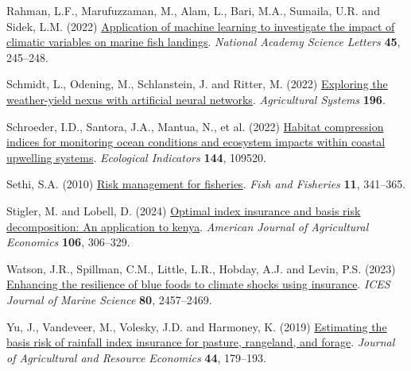 \documentclass[
  letterpaper,
  DIV=11,
  numbers=noendperiod]{scrartcl}
\newlength{\cslhangindent}
\newlength{\cslentryspacingunit} %
\newenvironment{CSLReferences}[2] %
 {%
  \setlength{\parindent}{0pt}
  \ifodd #1
  \let\oldpar\par
  \def\par{\hangindent=\cslhangindent\oldpar}
  \fi
  \setlength{\parskip}{#2\cslentryspacingunit}
 }%
 {}
\begin{document}
\begin{CSLReferences}{1}{0}
\leavevmode{}%
Rahman, L.F., Marufuzzaman, M., Alam, L., Bari, M.A., Sumaila, U.R. and
Sidek, L.M. (2022)
\href{https://doi.org/10.1007/s40009-022-01110-0}{Application of machine
learning to investigate the impact of climatic variables on marine fish
landings}. \emph{National Academy Science Letters} \textbf{45},
245--248.

\leavevmode{}%
Schmidt, L., Odening, M., Schlanstein, J. and Ritter, M. (2022)
\href{https://doi.org/10.1016/J.AGSY.2021.103345}{Exploring the
weather-yield nexus with artificial neural networks}. \emph{Agricultural
Systems} \textbf{196}.

\leavevmode{}%
Schroeder, I.D., Santora, J.A., Mantua, N., et al. (2022)
\href{https://doi.org/10.1016/j.ecolind.2022.109520}{Habitat compression
indices for monitoring ocean conditions and ecosystem impacts within
coastal upwelling systems}. \emph{Ecological Indicators} \textbf{144},
109520.

\leavevmode{}%
Sethi, S.A. (2010)
\href{https://doi.org/10.1111/j.1467-2979.2010.00363.x}{Risk management
for fisheries}. \emph{Fish and Fisheries} \textbf{11}, 341--365.

\leavevmode{}%
Stigler, M. and Lobell, D. (2024)
\href{https://doi.org/10.1111/ajae.12375}{Optimal index insurance and
basis risk decomposition: An application to kenya}. \emph{American
Journal of Agricultural Economics} \textbf{106}, 306--329.

\leavevmode{}%
Watson, J.R., Spillman, C.M., Little, L.R., Hobday, A.J. and Levin, P.S.
(2023) \href{https://doi.org/10.1093/icesjms/fsad175}{Enhancing the
resilience of blue foods to climate shocks using insurance}. \emph{ICES
Journal of Marine Science} \textbf{80}, 2457--2469.

\leavevmode{}%
Yu, J., Vandeveer, M., Volesky, J.D. and Harmoney, K. (2019)
\href{https://doi.org/10.22004/ag.econ.281319}{Estimating the basis risk
of rainfall index insurance for pasture, rangeland, and forage}.
\emph{Journal of Agricultural and Resource Economics} \textbf{44},
179--193.

\end{CSLReferences}
\end{document}
